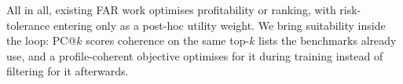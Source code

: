 All in all, existing FAR work optimises profitability or ranking, with risk-tolerance entering only as a post-hoc utility weight. We bring suitability inside the loop: PC@$k$ scores coherence on the same top-$k$ lists the benchmarks already use, and a profile-coherent objective optimises for it during training instead of filtering for it afterwards.
